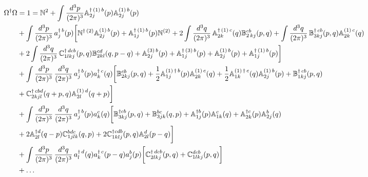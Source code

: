 \documentclass[aps,prd,amsmath,amssymb,nofootinbib]{revtex4-2}
\def\mf#1{\mathbb{#1}}
\numberwithin{equation}{section}
\begin{document}
\begin{align}
     \Omega^{\dagger}\Omega & = 1 = \mf{N}^{2} + \int \frac{d^{3}p}{(2\pi)^{3}} \mf{A}^{\dagger\,(1)\, b}_{2j}(p)\mf{A}^{(1)\,b}_{2j}(p) \notag \\ & +\int \frac{d^{3}p}{(2\pi)^{3}}\, a^{\dagger\, b}_{j}(p) \bigg[\mf{N}^{\dagger\, (2)}\mf{A}^{(1)\, b}_{2j}(p)+\mf{A}^{\dagger\,(1)\, b}_{1j}(p)\mf{N}^{(2)} + 2\int\frac{d^{3}q}{(2\pi)^{3}}\,\mf{A}^{\dagger\,(1)\, c}_{2k}(q)\mf{B}^{cb}_{2\,kj}(p,q)+\int\frac{d^{3}q}{(2\pi)^{3}}\,\mf{B}^{\dagger\, cb}_{3kj}(p,q)\mf{A}^{(1)\,c}_{2k}(q)\notag \\ & +2\int\frac{d^{3}q}{(2\pi)^{3}}\,\mf{C}^{\dagger\, dcb}_{1lkj}(p,q)\mf{B}^{cd}_{2kl}(q,p-q)+\mf{A}^{(3)\, b}_{2j}(p)+\mf{A}^{\dagger\,(3)\, b}_{1j}(p)+\mf{A}^{(1)\, b}_{2j}(p)+\mf{A}^{\dagger\,(1)\, b}_{1j}(p)\bigg]\notag \\ & + \int \frac{d^{3}p}{(2\pi)^{3}}\, \frac{d^{3}q}{(2\pi)^{3}}\, a^{\dagger\, b}_{j}(p)a^{\dagger\, c}_{k}(q) \bigg[\mf{B}^{cb}_{2kj}(p,q)+\frac{1}{2}\mf{A}^{(1)\, \dagger\, b}_{1j}(p)\mf{A}^{(1)\, c}_{2k}(q)+\frac{1}{2} \mf{A}^{(1)\, \dagger\, c}_{1k}(q)\mf{A}^{(1)\, b}_{2j}(p)+\mf{B}^{\dagger\, cb}_{1kj}(p,q)\notag \\ & +\mf{C}^{\dagger\, cbd}_{2kjl}(q+p,q)\mf{A}^{(1)\,d}_{2l}(q+p)\bigg] \notag \\ & 
     + \int \frac{d^{3}p}{(2\pi)^{3}}\, \frac{d^{3}q}{(2\pi)^{3}}\, a^{\dagger\, b}_{j}(p)a^{ c}_{k}(q) \bigg[\mf{B}^{\dagger cb}_{3kj}(p,q)+\mf{B}^{bc}_{3jk}(q,p)+\mf{A}^{\dagger b}_{1j}(p)\mf{A}^{c}_{1k}(q) + \mf{A}^{\dagger c}_{2k}(p)\mf{A}^{b}_{2j}(q) \notag \\ & 
    + 2 \mf{A}^{\dagger d}_{2l}(q-p)\mf{C}^{bdc}_{1jlk}(q,p)
    + 2 
    \mf{C}^{\dagger cdb}_{1klj}
    (p,q)\mf{A}^{d}_{2l}(p-q) \bigg] \notag \\ & 
    + \int \frac{d^{3}p}{(2\pi)^{3}}\, \frac{d^{3}q}{(2\pi)^{3}}\, a^{\dagger\, d}_{l}(q)a^{\dagger\, c}_{k}(p-q)a^{b}_{j}(p)\bigg[\mf{C}^{\dagger\, dcb}_{2lkj}(p,q)+\mf{C}^{dcb}_{1lkj}(p,q)\bigg]\notag \\ & + \ldots
\end{align}
\end{document}

